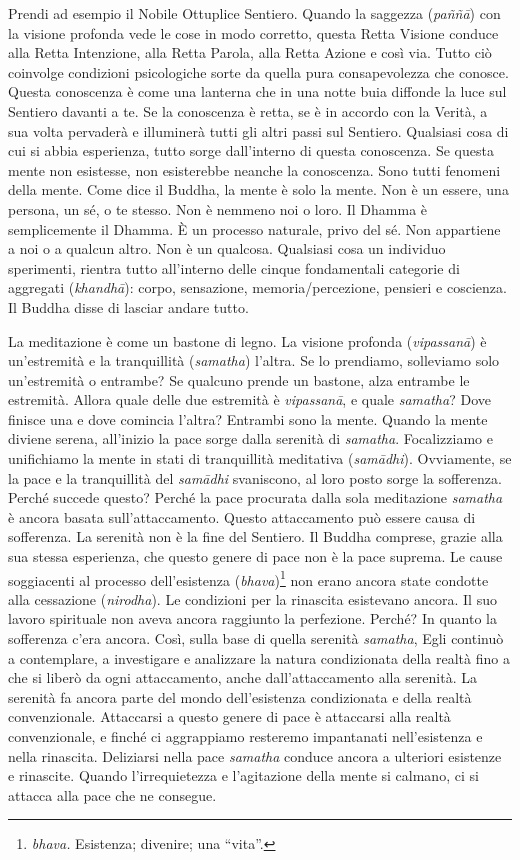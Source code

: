 Prendi ad esempio il Nobile Ottuplice Sentiero. Quando la saggezza
(\emph{paññā}) con la visione profonda vede le cose in modo corretto,
questa Retta Visione conduce alla Retta Intenzione, alla Retta Parola,
alla Retta Azione e così via. Tutto ciò coinvolge condizioni
psicologiche sorte da quella pura consapevolezza che conosce. Questa
conoscenza è come una lanterna che in una notte buia diffonde la luce
sul Sentiero davanti a te. Se la conoscenza è retta, se è in accordo con
la Verità, a sua volta pervaderà e illuminerà tutti gli altri passi sul
Sentiero. Qualsiasi cosa di cui si abbia esperienza, tutto sorge
dall'interno di questa conoscenza. Se questa mente non esistesse, non
esisterebbe neanche la conoscenza. Sono tutti fenomeni della mente. Come
dice il Buddha, la mente è solo la mente. Non è un essere, una persona,
un sé, o te stesso. Non è nemmeno noi o loro. Il Dhamma è semplicemente
il Dhamma. È un processo naturale, privo del sé. Non appartiene a noi o
a qualcun altro. Non è un qualcosa. Qualsiasi cosa un individuo
sperimenti, rientra tutto all'interno delle cinque fondamentali
categorie di aggregati (\emph{khandhā}): corpo, sensazione,
memoria/percezione, pensieri e coscienza. Il Buddha disse di lasciar
andare tutto.

La meditazione è come un bastone di legno. La visione profonda
(\emph{vipassanā}) è un'estremità e la tranquillità (\emph{samatha})
l'altra. Se lo prendiamo, solleviamo solo un'estremità o entrambe? Se
qualcuno prende un bastone, alza entrambe le estremità. Allora quale
delle due estremità è \emph{vipassanā}, e quale \emph{samatha}? Dove
finisce una e dove comincia l'altra? Entrambi sono la mente. Quando la
mente diviene serena, all'inizio la pace sorge dalla serenità di
\emph{samatha}. Focalizziamo e unifichiamo la mente in stati di
tranquillità meditativa (\emph{samādhi}). Ovviamente, se la pace e la
tranquillità del \emph{samādhi} svaniscono, al loro posto sorge la
sofferenza. Perché succede questo? Perché la pace procurata dalla sola
meditazione \emph{samatha} è ancora basata sull'attaccamento. Questo
attaccamento può essere causa di sofferenza. La serenità non è la fine
del Sentiero. Il Buddha comprese, grazie alla sua stessa esperienza, che
questo genere di pace non è la pace suprema. Le cause soggiacenti al
processo dell'esistenza (\emph{bhava})\footnote{\emph{bhava.} Esistenza;
  divenire; una ``vita''.} non erano ancora state condotte alla
cessazione (\emph{nirodha}). Le condizioni per la rinascita esistevano
ancora. Il suo lavoro spirituale non aveva ancora raggiunto la
perfezione. Perché? In quanto la sofferenza c'era ancora. Così, sulla
base di quella serenità \emph{samatha}, Egli continuò a contemplare, a
investigare e analizzare la natura condizionata della realtà fino a che
si liberò da ogni attaccamento, anche dall'attaccamento alla serenità.
La serenità fa ancora parte del mondo dell'esistenza condizionata e
della realtà convenzionale. Attaccarsi a questo genere di pace è
attaccarsi alla realtà convenzionale, e finché ci aggrappiamo resteremo
impantanati nell'esistenza e nella rinascita. Deliziarsi nella pace
\emph{samatha} conduce ancora a ulteriori esistenze e rinascite. Quando
l'irrequietezza e l'agitazione della mente si calmano, ci si attacca
alla pace che ne consegue.

